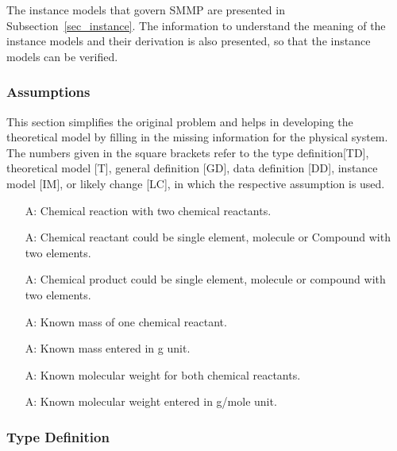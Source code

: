 \documentclass[12pt]{article}
\newcounter{assumpnum} %
\begin{document}
The instance models that govern SMMP are presented in
Subsection~\ref{sec_instance}.  The information to understand the meaning of the
instance models and their derivation is also presented, so that the instance
models can be verified.

\subsubsection{Assumptions} \label{sec_assumpt}

This section simplifies the original problem and helps in developing the
theoretical model by filling in the missing information for the physical
system. The numbers given in the square brackets refer to the  type definition[TD], theoretical model
[T], general definition [GD], data definition [DD], instance model [IM], or
likely change [LC], in which the respective assumption is used.

\begin{itemize}

\item[A\refstepcounter{assumpnum}\theassumpnum \label{Two reactants}:] Chemical reaction with two chemical reactants.
\item[A\refstepcounter{assumpnum}\theassumpnum \label{reactant compound}:] Chemical reactant could be single element, molecule or Compound with two elements.
\item[A\refstepcounter{assumpnum}\theassumpnum \label{product compound}:] Chemical product could be single element, molecule or compound with two elements.
\item[A\refstepcounter{assumpnum}\theassumpnum \label{Known mass}:] Known mass of one chemical reactant.
\item[A\refstepcounter{assumpnum}\theassumpnum \label{Mass unit}:] Known mass entered in g unit.
\item[A\refstepcounter{assumpnum}\theassumpnum \label{Known molecular weight}:] Known molecular weight for both chemical reactants.
\item[A\refstepcounter{assumpnum}\theassumpnum \label{Molecular weight unit}:] Known molecular weight entered in g/mole unit. 

\end{itemize}

\subsubsection{Type Definition}\label{Type_Detention}
\end{document}
